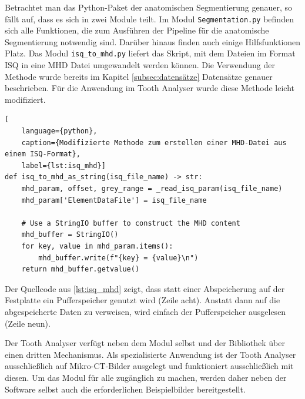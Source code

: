 Betrachtet man das Python-Paket der anatomischen Segmentierung genauer, so fällt
auf, dass es sich in zwei Module teilt. Im Modul \texttt{Segmentation.py}
befinden sich alle Funktionen, die zum Ausführen der Pipeline für die anatomische
Segmentierung notwendig sind. Darüber hinaus finden auch einige Hilfsfunktionen
Platz. Das Modul \texttt{isq\_to\_mhd.py} liefert das Skript, mit dem Dateien im
Format \ac{ISQ} in eine \ac{MHD} Datei umgewandelt werden können. Die Verwendung
der Methode wurde bereits im Kapitel \ref{subsec:datensätze} Datensätze genauer
beschrieben. Für die Anwendung im Tooth Analyser wurde diese Methode leicht modifiziert.

\begin{lstlisting}[
    language={python},
    caption={Modifizierte Methode zum erstellen einer MHD-Datei aus einem ISQ-Format},
    label={lst:isq_mhd}]
def isq_to_mhd_as_string(isq_file_name) -> str:
    mhd_param, offset, grey_range = _read_isq_param(isq_file_name)
    mhd_param['ElementDataFile'] = isq_file_name

    # Use a StringIO buffer to construct the MHD content
    mhd_buffer = StringIO()
    for key, value in mhd_param.items():
        mhd_buffer.write(f"{key} = {value}\n")
    return mhd_buffer.getvalue()
\end{lstlisting}

Der Quellcode aus \ref{lst:isq_mhd} zeigt, dass statt einer Abspeicherung auf der
Festplatte ein Pufferspeicher genutzt wird (Zeile acht). Anstatt dann auf die
abgespeicherte Daten zu verweisen, wird einfach der Pufferspeicher ausgelesen (Zeile
neun).

Der Tooth Analyser verfügt neben dem Modul selbst und der Bibliothek über einen dritten
Mechanismus. Als spezialisierte Anwendung ist der Tooth Analyser ausschließlich
auf Mikro-CT-Bilder ausgelegt und funktioniert ausschließlich mit diesen. Um das
Modul für alle zugänglich zu machen, werden daher neben der Software selbst auch
die erforderlichen Beispielbilder bereitgestellt.

